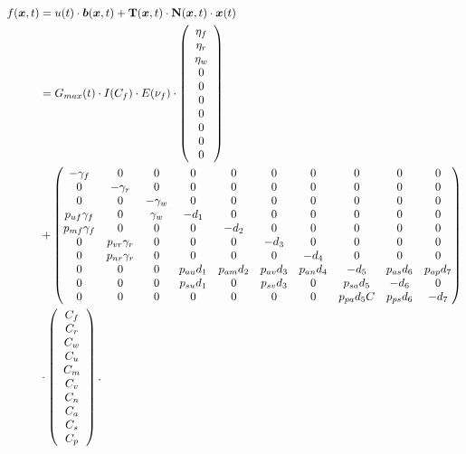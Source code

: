 \documentclass[11pt,a4paper]{article}
\begin{document}
\begin{align}
f({\bm x}, t) &= u(t) \cdot {\bm b}({\bm x}, t) + {\bf T}({\bm x}, t) \cdot {\bf N}({\bm x}, t) \cdot {\bm x}(t) \notag \\
&= G_{max}(t) \cdot I(C_f) \cdot E(\nu_f) \cdot \left( \begin{array}{c} \eta_f \\ \eta_r \\ \eta_w \\ 0 \\ 0 \\ 0 \\ 0 \\ 0 \\ 0 \\ 0 \end{array}\right) \notag \\
&+  \left( \begin{matrix}
	-\gamma_f & 0 & 0 & 0 & 0 & 0 & 0 & 0 & 0 & 0\\
	0 &  -\gamma_r & 0 & 0 & 0 & 0 & 0 & 0 & 0 & 0\\
	0 & 0 & -\gamma_w & 0 & 0 & 0 & 0 & 0 & 0  & 0\\
	p_{uf} \gamma_f & 0 & \gamma_w & -d_1 & 0 & 0 & 0 & 0 & 0 & 0 \\
	p_{mf} \gamma_f & 0 & 0 & 0 & -d_2 & 0 & 0 & 0 & 0 & 0 \\
	0 & p_{vr} \gamma_r & 0 & 0 & 0 & -d_3 & 0 & 0 & 0 & 0 \\
	0 & p_{nr} \gamma_r & 0 & 0 & 0 & 0 & -d_4 & 0 & 0 & 0 \\
	0 & 0 & 0 & p_{au} d_1 & p_{am} d_2 & p_{av} d_3 & p_{an} d_4 & -d_5 &  p_{as} d_6 & p_{ap} d_7 \\
	0 & 0 & 0 & p_{su} d_1 & 0 & p_{sv} d_3 & 0 & p_{sa} d_5 & -d_6 & 0 \\
	0 & 0 & 0 & 0 & 0 & 0 & 0 & p_{pa} d_5 C & p_{ps} d_6 & -d_7
	\end{matrix} \right) \notag \\
&\cdot \left( \begin{array}{c} C_f \\ C_r \\ C_w \\ C_u \\ C_m \\ C_v \\ C_n \\ C_a \\ C_s \\ C_p \end{array}\right).
\end{align}
\end{document}
